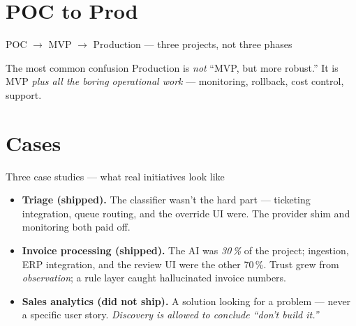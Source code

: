 \documentclass[aspectratio=169,11pt]{beamer}
\begin{document}
\section{POC to Prod}
\begin{frame}{POC $\to$ MVP $\to$ Production --- three projects, not three phases}
  \begin{center}
  \end{center}
  \begin{alertblock}{The most common confusion}
    Production is \emph{not} ``MVP, but more robust.'' It is MVP \emph{plus all the boring operational work} --- monitoring, rollback, cost control, support.
  \end{alertblock}
\end{frame}

\section{Cases}
\begin{frame}{Three case studies --- what real initiatives look like}
  \begin{itemize}
    \item \textbf{Triage \textcolor{cgreen}{(shipped)}.} The classifier wasn't the hard part --- ticketing integration, queue routing, and the override UI were. The provider shim and monitoring both paid off.
    \item \textbf{Invoice processing \textcolor{cgreen}{(shipped)}.} The AI was \emph{30\,\%} of the project; ingestion, ERP integration, and the review UI were the other 70\,\%. Trust grew from \emph{observation}; a rule layer caught hallucinated invoice numbers.
    \item \textbf{Sales analytics \textcolor{cred}{(did not ship)}.} A solution looking for a problem --- never a specific user story. \emph{Discovery is allowed to conclude ``don't build it.''}
  \end{itemize}
\end{frame}
\end{document}
